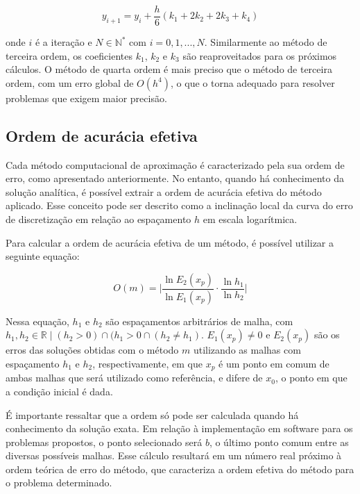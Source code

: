 \begin{equation}
	y_{i + 1} = y_i + \frac{h}{6}(k_1 + 2k_2 + 2k_3 + k_4)
\end{equation}

onde $i$ é a iteração e $N \in \mathbb{N}^*$ com $i = 0, 1,...,N$. Similarmente ao método de terceira ordem, os coeficientes $k_1$, $k_2$ e $k_3$ são reaproveitados para os próximos cálculos. O método de quarta ordem é mais preciso que o método de terceira ordem, com um erro global de $O(h^4)$, o que o torna adequado para resolver problemas que exigem maior precisão.

\subsection{Ordem de acurácia efetiva}\label{sec:error_approximation}\quad
Cada método computacional de aproximação é caracterizado pela sua ordem de erro, como apresentado anteriormente. No entanto, quando há conhecimento da solução analítica, é possível extrair a ordem de acurácia efetiva do método aplicado. Esse conceito pode ser descrito como a inclinação local da curva do erro de discretização em relação ao espaçamento $h$ em escala logarítmica.

Para calcular a ordem de acurácia efetiva de um método, é possível utilizar a seguinte equação:

\begin{equation}\label{effective_order}
O(m) =
\Bigg|
\dfrac{\ln{E_2(x_p)}}{\ln{E_1(x_p)}} \cdot \dfrac{\ln{h_1}}{\ln{h_2}}
\Bigg|
\end{equation}

Nessa equação, $h_1$ e $h_2$ são espaçamentos arbitrários de malha, com ${h_1,h_2 \in \mathbb{R} \mid (h_2 > 0) \cap (h_1 > 0 \cap (h_2 \ne h_1)}$. $E_1(x_p) \ne 0$ e $E_2(x_p)$ são os erros das soluções obtidas com o método $m$ utilizando as malhas com espaçamento $h_1$ e $h_2$, respectivamente, em que $x_p$ é um ponto em comum de ambas malhas que será utilizado como referência, e difere de $x_0$, o ponto em que a condição inicial é dada.

É importante ressaltar que a ordem só pode ser calculada quando há conhecimento da solução exata. Em relação à implementação em software para os problemas propostos, o ponto selecionado será $b$, o último ponto comum entre as diversas possíveis malhas. Esse cálculo resultará em um número real próximo à ordem teórica de erro do método, que caracteriza a ordem efetiva do método para o problema determinado.